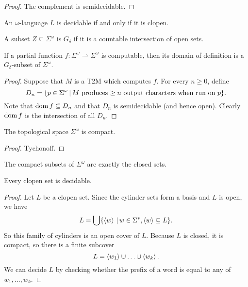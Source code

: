 \begin{proof}
  The complement is semidecidable.
\end{proof}

\begin{theorem}
  An $\omega$-language $L$ is decidable if and only if it is clopen.
\end{theorem}

\begin{definition}
  A subset $Z \subseteq \Sigma^\omega$ is $G_\delta$ if it is a countable
  intersection of open sets.
\end{definition}

\begin{theorem}
  If a partial function $f: \Sigma^\omega \rightharpoonup \Sigma^\omega$ is
  computable, then its domain of definition is a $G_\delta$-subset of
  $\Sigma^\omega$.
\end{theorem}

\begin{proof}
  Suppose that $M$ is a T2M which computes $f$.
  For every $n \ge 0$, define
  \[
	D_n = \{ p \in \Sigma^\omega \,|\, \text{$M$ produces $\ge n$ output
	  characters when run on $p$} \}.
  \]
  Note that $\operatorname{dom} f \subseteq D_n$ and that $D_n$ is semidecidable (and hence
  open).
  Clearly $\operatorname{dom} f$ is the intersection of all $D_n$.
\end{proof}


\begin{theorem}
  The topological space $\Sigma^\omega$ is compact.
\end{theorem}

\begin{proof}
  Tychonoff.
\end{proof}

\begin{corollary}
  The compact subsets of $\Sigma^\omega$ are exactly the closed sets.
\end{corollary}

\begin{lemma}
  Every clopen set is decidable.
\end{lemma}

\begin{proof}
  Let $L$ be a clopen set.
  Since the cylinder sets form a basis and $L$ is open, we have
  \[
	L = \bigcup \{ \left< w \right> \,|\, w \in \Sigma^*, \left< w \right> \subseteq L \}.
  \]
  So this family of cylinders is an open cover of $L$.
  Because $L$ is closed, it is compact, so there is a finite subcover
  \[
	L = \left< w_1 \right> \cup \ldots \cup \left< w_k \right>.
  \]
  We can decide $L$ by checking whether the prefix of a word is equal to any of
  $w_1, \ldots, w_k$.
\end{proof}

